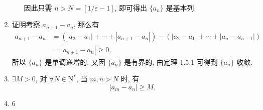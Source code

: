\documentclass[12pt, a4paper]{article}
\begin{document}
\begin{enumerate}
\begin{enumerate}[(1)]
\begin{align*}
                \end{align*}
                因此只需 $n > N = [1/\varepsilon - 1]$, 即可得出 $\{a_n\}$ 是基本列.
        \end{enumerate}
    \item {\heiti 证明}\quad 考察 $a_{n+1} - a_n$, 那么有
        \begin{align*}
            a_{n+1} - a_n &= \left(|a_2-a_1| + \cdots + |a_{n+1}-a_n|\right) - \left(|a_2-a_1| + \cdots + |a_n-a_{n-1}|\right) \\
                          &= |a_{n+1}-a_n| \geqslant 0,
        \end{align*}
        所以 $\{a_n\}$ 是单调递增的. 又因 $\{a_n\}$ 是有界的, 由定理 1.5.1 可得到 $\{a_n\}$ 收敛.
    \item $\exists M > 0$, 对 $\forall N \in \mathrm{N}^*$, 当 $m, n > N$ 时, 有
        \[
            |a_m - a_n| \geqslant M.   
        \]
    \item 6
\end{enumerate}
\end{document}
